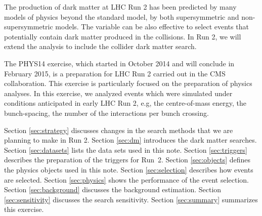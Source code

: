 The production of dark matter at LHC Run 2 has been predicted by many
models of physics beyond the standard model, by both supersymmetric and
non-supersymmetric models. The variable \alphat can be also effective to
select events that potentially contain dark matter produced in the
collisions. In Run 2, we will extend the \alphat analysis to include the
collider dark matter search.

The PHYS14 exercise, which started in October 2014 and will conclude in
February 2015, is a preparation for LHC Run 2 carried out in the CMS
collaboration. This exercise is particularly focused on the preparation
of physics analyses. In this exercise, we analyzed events which were
simulated under conditions anticipated in early LHC Run 2, e.g, the
centre-of-mass energy, the bunch-spacing, the number of the interactions
per bunch crossing.

Section \ref{sec:strategy} discusses changes in the search methods that
we are planning to make in Run 2. Section \ref{sec:dm} introduces the
dark matter searches. Section \ref{sec:datasets} lists the data sets
used in this note. Section \ref{sec:triggers} describes the preparation
of the triggers for Run~2. Section \ref{sec:objects} defines the physics
objects used in this note. Section \ref{sec:selection} describes how
events are selected. Section \ref{sec:physics} shows the performance of
the event selection. Section \ref{sec:background} discusses the
background estimation. Section \ref{sec:sensitivity} discusses the
search sensitivity. Section \ref{sec:summary} summarizes this exercise.




